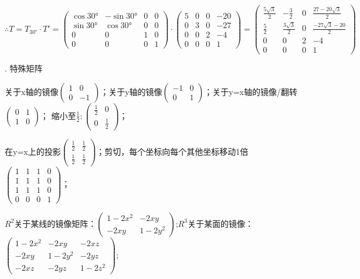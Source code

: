 \documentclass[fleqn]{article}
\begin{document}
$\therefore T=T_{30°}\cdot T'=\begin{pmatrix}
    \cos30°&-\sin30°&0&0\\
    \sin30°&\cos30°&0&0\\
    0&0&1&0\\
    0&0&0&1
\end{pmatrix}\cdot\begin{pmatrix}
    5&0&0&-20\\
    0&3&0&-27\\
    0&0&2&-4\\
    0&0&0&1
\end{pmatrix}=\begin{pmatrix}
    \frac{5\sqrt{3}}{2}&-\frac{3}{2}&0&\frac{27-20\sqrt{3}}{2}\\
    \frac{5}{2}&\frac{3\sqrt{3}}{2}&0&\frac{-27\sqrt{3}-20}{2}\\
    0&0&2&-4\\
    0&0&0&1
\end{pmatrix}$

. 特殊矩阵

关于x轴的镜像$\begin{pmatrix}
    1&0\\0&-1
\end{pmatrix}$；关于y轴的镜像$\begin{pmatrix}
    -1&0\\0&1
\end{pmatrix}$；关于y=x轴的镜像/翻转$\begin{pmatrix}
    0&1\\1&0
\end{pmatrix}$；
缩小至$\frac{1}{2}:\begin{pmatrix}
    \frac{1}{2}&0\\0&\frac{1}{2}
\end{pmatrix}$；

在y=x上的投影$\begin{pmatrix}
    \frac{1}{2}&\frac{1}{2}\\\frac{1}{2}&\frac{1}{2}
\end{pmatrix}$；剪切，每个坐标向每个其他坐标移动1倍$\begin{pmatrix}
    1&1&1&0\\
    1&1&1&0\\
    1&1&1&0\\
    0&0&0&1
\end{pmatrix}$；

$R^2$关于某线的镜像矩阵：$\begin{pmatrix}
    1-2x^2&-2xy\\-2xy&1-2y^2
\end{pmatrix}$;$R^3$关于某面的镜像：$\begin{pmatrix}
    1-2x^2&-2xy&-2xz\\
    -2xy&1-2y^2&-2yz\\
    -2xz&-2yz&1-2z^2
\end{pmatrix}$;
\end{document}
